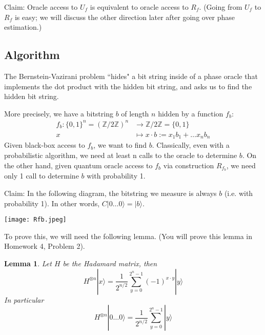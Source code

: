 \documentclass{article}
\newtheorem{lem}[thm]{Lemma}
\newcommand{\ket}[1]{|#1\rangle}
\begin{document}
Claim: Oracle access to $U_f$ is equivalent to oracle access to $R_f$. (Going from $U_f$ to $R_f$ is easy; we will discuss the other direction later after going over phase estimation.)

\subsection{Algorithm}
The Bernstein-Vazirani problem ``hides" a bit string inside of a phase oracle that implements the dot product with the hidden bit string, and asks us to find the hidden bit string.

More precisely, we have a bitstring $b$ of length $n$ hidden by a function $f_b$:
\begin{align*}
    f_b: \{0,1\}^n=(\mathbb{Z}/2\mathbb{Z})^n &\longrightarrow \mathbb{Z}/2\mathbb{Z}=\{0,1\} \\
    x &\longmapsto x \cdot b := x_1 b_1 + \dots x_n b_n
\end{align*}
Given black-box access to $f_b$, we want to find $b$. Classically, even with a probabilistic algorithm, we need at least n calls to the oracle to determine $b$. On the other hand, given quantum oracle access to $f_b$ via construction $R_{f_b}$, we need only 1 call to determine $b$ with probability 1. 

Claim: In the following diagram, the bitstring we measure is always $b$ (i.e. with probability 1). In other words, $C\ket{0 \dots 0}=\ket{b}$.

\begin{center}
    \texttt{[image: Rfb.jpeg]}
\end{center}

To prove this, we will need the following lemma. (You will prove this lemma in Homework 4, Problem 2).

\begin{lem}
    Let $H$ be the Hadamard matrix, then 
    $$H^{\otimes n} \ket{x} = \frac{1}{2^{n/2}} \sum_{y=0}^{2^n-1} (-1)^{x \cdot y} \ket{y}$$
    In particular
     $$H^{\otimes n} \ket{0 \dots 0} = \frac{1}{2^{n/2}} \sum_{y=0}^{2^n-1} \ket{y}$$
\end{lem}
\end{document}
